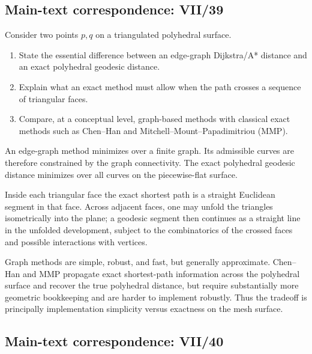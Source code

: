 \subsection*{Main-text correspondence: VII/39}

\begin{problem}
\label{prob:cp-vii-0093}
Consider two points \(p,q\) on a triangulated polyhedral surface.

\begin{enumerate}
\item State the essential difference between an edge-graph Dijkstra/A*
distance and an exact polyhedral geodesic distance.
\item Explain what an exact method must allow when the path crosses a sequence
of triangular faces.
\item Compare, at a conceptual level, graph-based methods with classical exact
methods such as Chen--Han and Mitchell--Mount--Papadimitriou (MMP).
\end{enumerate}
\end{problem}

\begin{solution}
An edge-graph method minimizes over a finite graph.  Its admissible curves are
therefore constrained by the graph connectivity.  The exact polyhedral
geodesic distance minimizes over all curves on the piecewise-flat surface.

Inside each triangular face the exact shortest path is a straight Euclidean
segment in that face.  Across adjacent faces, one may unfold the triangles
isometrically into the plane; a geodesic segment then continues as a straight
line in the unfolded development, subject to the combinatorics of the crossed
faces and possible interactions with vertices.

Graph methods are simple, robust, and fast, but generally approximate.
Chen--Han and MMP propagate exact shortest-path information across the
polyhedral surface and recover the true polyhedral distance, but require
substantially more geometric bookkeeping and are harder to implement robustly.
Thus the tradeoff is principally implementation simplicity versus exactness on
the mesh surface.
\end{solution}

\subsection*{Main-text correspondence: VII/40}

